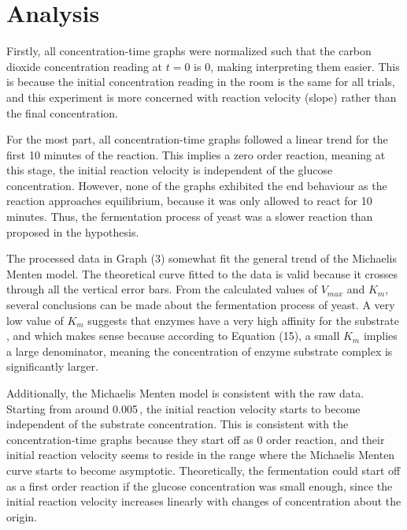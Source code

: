 \documentclass{article}
\begin{document}
\section{Analysis}
Firstly, all concentration-time graphs were normalized such that the carbon dioxide concentration reading at $t=0$ is 0, making interpreting them easier. This is because the initial concentration reading in the room is the same for all trials, and this experiment is more concerned with reaction velocity (slope) rather than the final  concentration.

\medskip

For the most part, all concentration-time graphs followed a linear trend for the first 10 minutes of the reaction. This implies a zero order reaction, meaning at this stage, the initial reaction velocity is independent of the glucose concentration. However, none of the graphs exhibited the end behaviour as the reaction approaches equilibrium, because it was only allowed to react for 10 minutes. Thus, the fermentation process of yeast was a slower reaction than proposed in the hypothesis.

\medskip

The processed data in Graph (3) somewhat fit the general trend of the Michaelis Menten model. The theoretical curve fitted to the data is valid because it crosses through all the vertical error bars. From the calculated values of $V_{max}$ and $K_m$, several conclusions can be made about the fermentation process of yeast. A very low value of $K_m$ suggests that enzymes have a very high affinity for the substrate \parencite{biochem}, and which makes sense because according to Equation (15), a small $K_m$ implies a large denominator, meaning the concentration of enzyme substrate complex is significantly larger.

\medskip

Additionally, the Michaelis Menten model is consistent with the raw data. Starting from around 0.005\,, the initial reaction velocity starts to become independent of the substrate concentration. This is consistent with the concentration-time graphs because they start off as 0 order reaction, and their initial reaction velocity seems to reside in the range where the Michaelis Menten curve starts to become asymptotic. Theoretically, the fermentation could start off as a first order reaction if the glucose concentration was small enough, since the initial reaction velocity increases linearly with changes of concentration about the origin.
\end{document}

